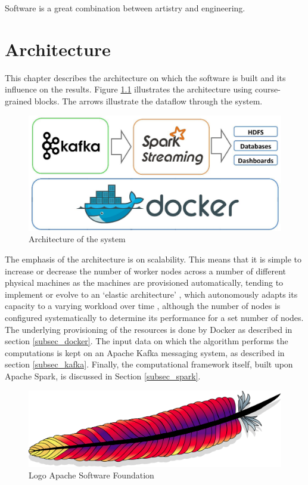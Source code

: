 \begin{savequote}[90mm] 
Software is a great combination between artistry and engineering.  
\end{savequote}

\chapter{Architecture \label{chap3:architecture}}
This chapter describes the architecture on which the software is built and its influence on the results. Figure \ref{fig:architecture} illustrates the architecture using course-grained blocks. The arrows illustrate the dataflow through the system. 

\begin{figure}[ht!]
\centering
\includegraphics[width=\textwidth]{figures/architecture.jpg}
\caption{Architecture of the system}
\label{fig:architecture}
\end{figure}

The emphasis of the architecture is on scalability. This means that it is simple to increase or decrease the number of worker nodes across a number of different physical machines as the machines are provisioned automatically, tending to implement or evolve to an `elastic architecture' \cite{9780470887998}, which autonomously adapts its capacity to a varying workload over time \cite{180145}, although the number of nodes is configured systematically to determine its performance for a set number of nodes. The underlying provisioning of the resources is done by Docker as described in section \ref{subsec_docker}. The input data on which the algorithm performs the computations is kept on an Apache Kafka messaging system, as described in section \ref{subsec_kafka}. Finally, the computational framework itself, built upon Apache Spark, is discussed in Section \ref{subsec_spark}.

\begin{figure}[ht!]
\centering
\includegraphics[width=.6\textwidth]{figures/asf.png}
\caption{Logo Apache Software Foundation}
\label{fig:asf}
\end{figure}


